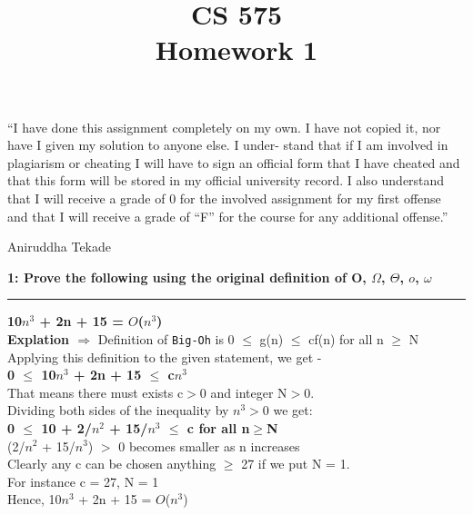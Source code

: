\documentclass[12pt]{article}
\newcommand\question[3]{\vspace{.25in}\textbf{#1: #2}\vspace{.5em}\hrule\vspace{.10in}}
\renewcommand\part[1]{\vspace{.10in}\textbf{(#1)}}
\begin{document}
\raggedright
\title{CS 575\\Homework 1}
\date{}
\maketitle
“I have done this assignment completely on my own. I have not
copied it, nor have I given my solution to anyone else. I under-
stand that if I am involved in plagiarism or cheating I will have
to sign an official form that I have cheated and that this form will
be stored in my official university record. I also understand that
I will receive a grade of 0 for the involved assignment for my first
offense and that I will receive a grade of “F” for the course for any
additional offense.”
\begin{flushright}
Aniruddha Tekade
\end{flushright}
\hrulefill
\newcommand\NAME{Aniruddha Tekade}  	%
\newcommand\ANDREWID{B00618834}     	%
\newcommand\HWNUM{1}              	%

\question{1}{Prove the following using the original definition of O, $\Omega$, $\Theta$, $o$, $\omega$} 

\part{a} \textbf{10$n^3$ + 2n + 15 = $O$($n^3$)}
\\
\textbf{Explation $\Rightarrow$} Definition of \texttt{Big-Oh} is 0 $\leq$ g(n) $\leq$ cf(n) for all n $\geq$ N 
\\
Applying this definition to the given statement,  we get -
\\
\hspace{3cm}\textbf{0 $\leq$ 10$n^3$ + 2n + 15 $\leq$ c$n^3$} 
\\
That means there must exists c$>$0	and	integer	N$>$0.
\\Dividing both sides of the inequality by	$n^3$$>$0 we get:
\\ \hspace{3cm}\textbf{0 $\leq$ 10 + 2/$n^2$ + 15/$n^3$ $\leq$ c for all n$\geq$N}
\\
(2/$n^2$ + 15/$n^3$)	 $>$ 0 becomes smaller as n increases
\\
Clearly any c can be chosen anything $\geq$ 27 if we put N = 1. 
\\ For instance c = 27, N = 1
\\Hence, 10$n^3$ + 2n + 15 = $O$($n^3$)
\end{document}

